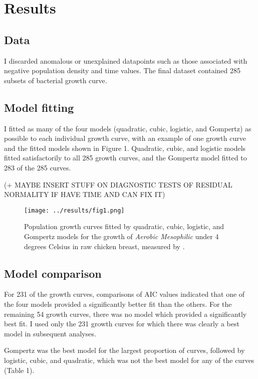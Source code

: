 \documentclass[11pt]{article}
\begin{document}
	
	
	\section{Results}
	
	\subsection{Data}
	
	I discarded anomalous or unexplained datapoints such as those associated with negative population density and time values. The final dataset contained 285 subsets of bacterial growth curve.
	
	
	\subsection{Model fitting}
	
	I fitted as many of the four models (quadratic, cubic, logistic, and Gompertz) as possible to each individual growth curve, with an example of one growth curve and the fitted models shown in Figure 1. Quadratic, cubic, and logistic models fitted satisfactorily to all 285 growth curves, and the Gompertz model fitted to 283 of the 285 curves.  
	
	(+ MAYBE INSERT STUFF ON DIAGNOSTIC TESTS OF RESIDUAL NORMALITY IF HAVE TIME AND CAN FIX IT)
	
	\begin{figure}[htbp]
		\centering
		\texttt{[image: ../results/fig1.png]}
		\caption{Population growth curves fitted by quadratic, cubic, logistic, and Gompertz models for the growth of \textit{Aerobic Mesophilic} under 4 degrees Celsius in raw chicken breast, measured by \cite{bae2014growth}.}
		\label{fig1}
	\end{figure}
	
	
	\subsection{Model comparison}
	
	For 231 of the growth curves, comparisons of AIC values indicated that one of the four models provided a significantly better fit than the others. For the remaining 54 growth curves, there was no model which provided a significantly best fit. I used only the 231 growth curves for which there was clearly a best model in subsequent analyses. 
	
	Gompertz was the best model for the largest proportion of curves, followed by logistic, cubic, and quadratic, which was not the best model for any of the curves (Table 1).
	
\end{document}
